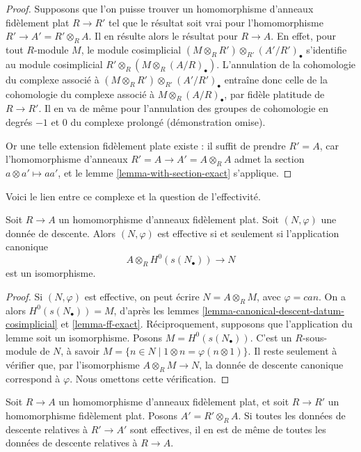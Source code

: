 \begin{proof}
Supposons que l'on puisse trouver un homomorphisme d'anneaux fidèlement plat
$R \to R'$ tel que le résultat soit vrai pour l'homomorphisme
$R' \to A' = R' \otimes_R A$. Il en résulte alors le résultat pour
$R \to A$. En effet, pour tout $R$-module $M$, le module cosimplicial
$(M \otimes_R R') \otimes_{R'} (A'/R')_\bullet$
s'identifie au module cosimplicial $R' \otimes_R (M \otimes_R (A/R)_\bullet)$.
L'annulation de la cohomologie du complexe associé à
$(M \otimes_R R') \otimes_{R'} (A'/R')_\bullet$ entraîne donc celle
de la cohomologie du complexe associé à
$M \otimes_R (A/R)_\bullet$, par fidèle platitude de $R \to R'$.
Il en va de même pour l'annulation des groupes de cohomologie en degrés
$-1$ et $0$ du complexe prolongé (démonstration omise).

\medskip\noindent
Or une telle extension fidèlement plate existe : il suffit de prendre $R' = A$,
car l'homomorphisme d'anneaux $R' = A \to A' = A \otimes_R A$ admet la section
$a \otimes a' \mapsto aa'$, et le
lemme \ref{lemma-with-section-exact} s'applique.
\end{proof}

\noindent
Voici le lien entre ce complexe et la question de l'effectivité.

\begin{lemma}
\label{lemma-recognize-effective}
Soit $R \to A$ un homomorphisme d'anneaux fidèlement plat.
Soit $(N, \varphi)$ une donnée de descente.
Alors $(N, \varphi)$ est effective si et seulement si l'application canonique
$$
A \otimes_R H^0(s(N_\bullet)) \longrightarrow N
$$
est un isomorphisme.
\end{lemma}

\begin{proof}
Si $(N, \varphi)$ est effective, on peut écrire $N = A \otimes_R M$,
avec $\varphi = can$. On a alors $H^0(s(N_\bullet)) = M$, d'après
les lemmes \ref{lemma-canonical-descent-datum-cosimplicial}
et \ref{lemma-ff-exact}. Réciproquement, supposons que l'application du lemme
soit un isomorphisme. Posons $M = H^0(s(N_\bullet))$.
C'est un $R$-sous-module de $N$,
à savoir $M = \{n \in N \mid 1 \otimes n = \varphi(n \otimes 1)\}$.
Il reste seulement à vérifier que, par l'isomorphisme
$A \otimes_R M \to N$,
la donnée de descente canonique correspond à $\varphi$.
Nous omettons cette vérification.
\end{proof}

\begin{lemma}
\label{lemma-descent-descends}
Soit $R \to A$ un homomorphisme d'anneaux fidèlement plat, et soit $R \to R'$
un homomorphisme fidèlement plat. Posons $A' = R' \otimes_R A$.
Si toutes les données de descente relatives à $R' \to A'$ sont effectives,
il en est de même de toutes les données de descente relatives à $R \to A$.
\end{lemma}

